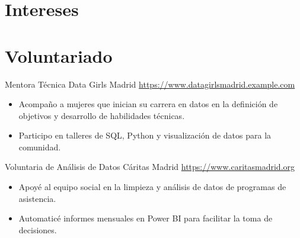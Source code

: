 \documentclass[a4paper, serif, 10pt]{moderncv}
\begin{document}
\section{Intereses}

\section{Voluntariado}

        {Mentora Técnica}
        {Data Girls Madrid}
        {\url{https://www.datagirlsmadrid.example.com}}
        {}
        {\begin{itemize}
\item Acompaño a mujeres que inician su carrera en datos en la definición de objetivos y desarrollo de habilidades técnicas.
\item Participo en talleres de SQL, Python y visualización de datos para la comunidad.
\end{itemize}}
    

        {Voluntaria de Análisis de Datos}
        {Cáritas Madrid}
        {\url{https://www.caritasmadrid.org}}
        {}
        {\begin{itemize}
\item Apoyé al equipo social en la limpieza y análisis de datos de programas de asistencia.
\item Automaticé informes mensuales en Power BI para facilitar la toma de decisiones.
\end{itemize}}
    
\end{document}

